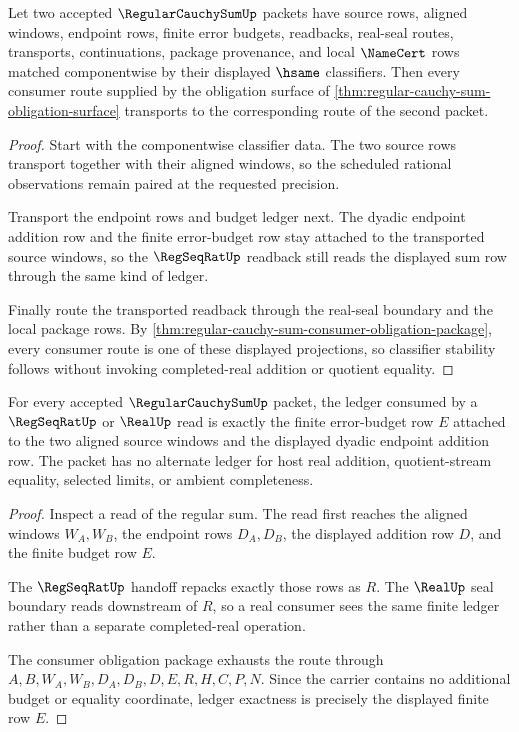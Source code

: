 \begin{theorem}
\label{thm:regular-cauchy-sum-classifier-stability}
Let two accepted $\RegularCauchySumUp$ packets have source rows, aligned windows, endpoint rows, finite error budgets, readbacks, real-seal routes, transports, continuations, package provenance, and local $\NameCert$ rows matched componentwise by their displayed $\hsame$ classifiers. Then every consumer route supplied by the obligation surface of \autoref{thm:regular-cauchy-sum-obligation-surface} transports to the corresponding route of the second packet.
\end{theorem}
\begin{proof}
Start with the componentwise classifier data. The two source rows transport together with their aligned windows, so the scheduled rational observations remain paired at the requested precision.

Transport the endpoint rows and budget ledger next. The dyadic endpoint addition row and the finite error-budget row stay attached to the transported source windows, so the $\RegSeqRatUp$ readback still reads the displayed sum row through the same kind of ledger.

Finally route the transported readback through the real-seal boundary and the local package rows. By \autoref{thm:regular-cauchy-sum-consumer-obligation-package}, every consumer route is one of these displayed projections, so classifier stability follows without invoking completed-real addition or quotient equality.
\end{proof}

\begin{theorem}
\label{thm:regular-cauchy-sum-ledger-exactness}
For every accepted $\RegularCauchySumUp$ packet, the ledger consumed by a $\RegSeqRatUp$ or $\RealUp$ read is exactly the finite error-budget row $E$ attached to the two aligned source windows and the displayed dyadic endpoint addition row. The packet has no alternate ledger for host real addition, quotient-stream equality, selected limits, or ambient completeness.
\end{theorem}
\begin{proof}
Inspect a read of the regular sum. The read first reaches the aligned windows $W_A,W_B$, the endpoint rows $D_A,D_B$, the displayed addition row $D$, and the finite budget row $E$.

The $\RegSeqRatUp$ handoff repacks exactly those rows as $R$. The $\RealUp$ seal boundary reads downstream of $R$, so a real consumer sees the same finite ledger rather than a separate completed-real operation.

The consumer obligation package exhausts the route through $A,B,W_A,W_B,D_A,D_B,D,E,R,H,C,P,N$. Since the carrier contains no additional budget or equality coordinate, ledger exactness is precisely the displayed finite row $E$.
\end{proof}

